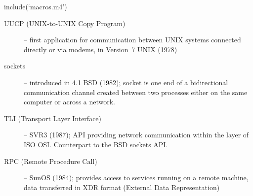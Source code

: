 
include(`macros.m4')

\pagebreak
{}

\begin{slide}
\end{slide}


\label{NETWORKING}

\begin{slide}
\begin{description}
\item[UUCP (UNIX-to-UNIX Copy Program)] -- first application for communication
between UNIX systems connected directly or via modems, in Version~7 UNIX (1978)
\item[sockets] -- introduced in 4.1 BSD (1982); socket is one end of a
bidirectional communication channel created between two processes either on the
same computer or across a network.
\item[TLI (Transport Layer Interface)] -- SVR3 (1987); API providing network
communication within the  layer of ISO OSI.  Counterpart to the BSD
sockets API.
\item[RPC (Remote Procedure Call)] -- SunOS (1984); provides access to services
running on a remote machine, data transferred in XDR format (External Data
Representation)
\end{description}
\end{slide}

